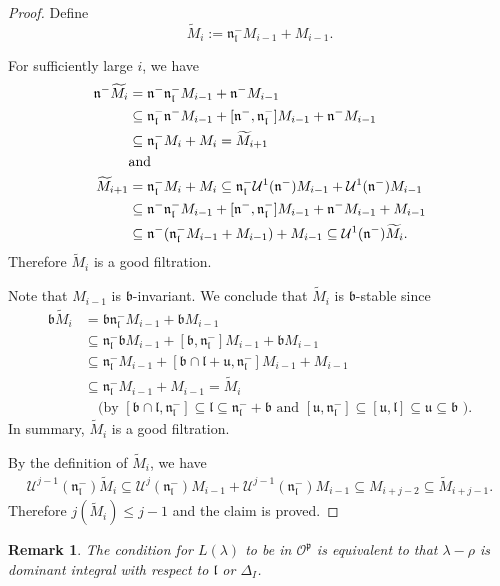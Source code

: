 \documentclass{amsart}[12pt]
\newtheorem{Rem}{Remark}[section]
\def\fbb{\mathfrak{b}}
\def\fnn{\mathfrak{n}}
\def\fpp{\mathfrak{p}}
\def\fuu{\mathfrak{u}}
\def\fll{\mathfrak{l}}
\def\fbb{\mathfrak{b}}
\def\cO{\mathcal{O}}
\def\cU{\mathcal{U}}
\def\tM{\widetilde{M}}
\renewcommand{\subset}{\subseteq}
\numberwithin{equation}{section}
\begin{document}
\begin{proof}
	\proof
	Define 
	\[
		\tM_i := \fnn_\fll^- M_{i-1} + M_{i-1}.
	\]	

	For sufficiently large $i$, we have 
	\[
	\begin{split}
		\fnn^- \tM_i & = \fnm \fnlm M_{i-1} + \fnm M_{i-1}\\
		 &\subset  \fnlm \fnm M_{i-1} + [\fnm,\fnlm] M_{i-1} + \fnm M_{i-1} \\
		 &\subset \fnlm  M_i + M_i = \tM_{i+1} \\
		 & \text{and}\\
	\tM_{i+1} 	& = \fnn_\fll^- M_i + M_i \subset \fnlm \cU^1(\fnm) M_{i-1} +
	\cU^1(\fnm) M_{i-1} \\
	& \subset \fnn^- \fnn_\fll^- M_{i-1} + [\fnn^-, \fnn^-_\fll] M_{i-1}
	+ \fnn^- M_{i-1} + M_{i-1}\\
	& \subset \fnn^- (\fnn_\fll^- M_{i-1}+ M_{i-1}) + M_{i-1} \subset  \cU^1(\fnn^-) \tM_{i}.
	\end{split}
	\]
	Therefore $\tM_i$ is a good filtration. %

	Note that $M_{i-1}$ is $\fbb$-invariant. We conclude that  
	$\tM_i$ is $\fbb$-stable since %
	\[
	\begin{split}
	\fbb\tM_i &= \fbb\fnn_{\fll}^- M_{i-1}   + \fbb M_{i-1}\\
	& \subset \fnn_{\fll}^- \fbb M_{i-1} + [\fbb, \fnn_{\fll}^-] M_{i-1} + \fbb M_{i-1}  \\
	& \subset  \fnn_{\fll}^- M_{i-1} + [\fbb\cap \fll + \fuu, \fnn_{\fll}^-]
	M_{i-1}  + M_{i-1}\\
	& \subset \fnn_{\fll}^- M_{i-1} + M_{i-1} = \tM_i\\
	& \quad  \text{(by $[\fbb\cap \fll, \fnn_{\fll}^-] \subset \fll \subset \fnn_\fll^-
		+ \fbb$ and $[\fuu, \fnn_{\fll}^-]\subset[\fuu, \fll] \subset \fuu\subset \fbb$ )}.
	\end{split}
	\]
	In summary, $\tM_i$ is a good filtration. 

	By the definition of $\tM_i$, we have 
	\[
	\begin{split}
	\cU^{j-1}(\fnn_{\fll}^-)\tM_i \subset \cU^j(\fnn_\fll^-)M_{i-1} +
	\cU^{j-1}(\fnn_\fll^-)M_{i-1} \subset M_{i+j-2}\subset \tM_{i+j-1}.
	\end{split}
	\]
	Therefore $j(\tM_i)\leq  j-1$ and the claim is proved.    
\end{proof}



\begin{Rem}
	The condition for $L(\lambda)$  to be in $\mathscr{O}^\fpp$ is equivalent to that $\lambda-\rho$ is dominant integral with respect to $\fll$ or $\Delta_I$.
\end{Rem}
%
%
%
\end{document}
